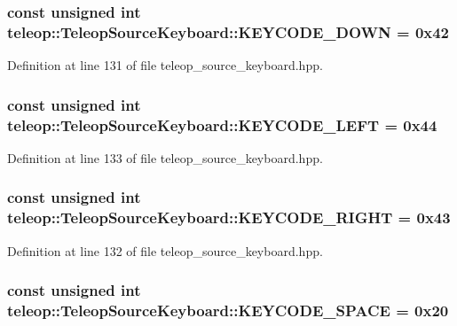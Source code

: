 \subsubsection[{KEYCODE\_\-DOWN}]{\setlength{\rightskip}{0pt plus 5cm}const unsigned int {\bf teleop::TeleopSourceKeyboard::KEYCODE\_\-DOWN} = 0x42\hspace{0.3cm}{\ttfamily  [static, private]}}\label{classteleop_1_1TeleopSourceKeyboard_abe548a06d67edb0f75672ee2d386cdfc}


Definition at line 131 of file teleop\_\-source\_\-keyboard.hpp.

\subsubsection[{KEYCODE\_\-LEFT}]{\setlength{\rightskip}{0pt plus 5cm}const unsigned int {\bf teleop::TeleopSourceKeyboard::KEYCODE\_\-LEFT} = 0x44\hspace{0.3cm}{\ttfamily  [static, private]}}\label{classteleop_1_1TeleopSourceKeyboard_afbed9335a8e3178b1e231700e3bd9439}


Definition at line 133 of file teleop\_\-source\_\-keyboard.hpp.

\subsubsection[{KEYCODE\_\-RIGHT}]{\setlength{\rightskip}{0pt plus 5cm}const unsigned int {\bf teleop::TeleopSourceKeyboard::KEYCODE\_\-RIGHT} = 0x43\hspace{0.3cm}{\ttfamily  [static, private]}}\label{classteleop_1_1TeleopSourceKeyboard_a9bfab5df9ab3df814bf7ce6ab39e0623}


Definition at line 132 of file teleop\_\-source\_\-keyboard.hpp.

\subsubsection[{KEYCODE\_\-SPACE}]{\setlength{\rightskip}{0pt plus 5cm}const unsigned int {\bf teleop::TeleopSourceKeyboard::KEYCODE\_\-SPACE} = 0x20\hspace{0.3cm}{\ttfamily  [static, private]}}\label{classteleop_1_1TeleopSourceKeyboard_aaeaf99220d79f9b4221efb4cdfd27f80}



